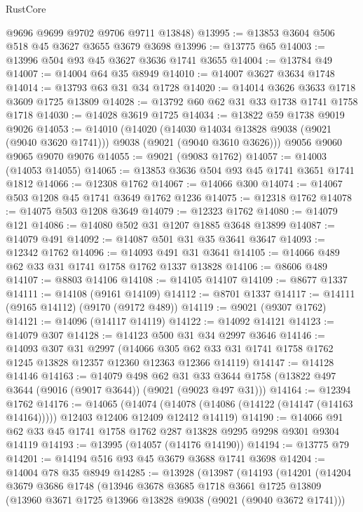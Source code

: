 \begin{lexlean}{RustCore}
\begin{coremodule}
      @9696
      @9699
      @9702
      @9706
      @9711
      @13848)
@13995 := @13853 @3604 @506 @518 @45 @3627 @3655 @3679 @3698
@13996 := @13775 @65
@14003 := @13996 @504 @93 @45 @3627 @3636 @1741 @3655
@14004 := @13784 @49
@14007 := @14004 @64 @35 @8949
@14010 := @14007 @3627 @3634 @1748
@14014 := @13793 @63 @31 @34 @1728
@14020 := @14014 @3626 @3633 @1718 @3609 @1725 @13809
@14028 := @13792 @60 @62 @31 @33 @1738 @1741 @1758 @1718
@14030 := @14028 @3619 @1725
@14034 := @13822 @59 @1738 @9019 @9026
@14053 := @14010
    (@14020
      (@14030 @14034 @13828 @9038 (@9021 (@9040 @3620 @1741)))
      @9038
      (@9021 (@9040 @3610 @3626)))
    @9056
    @9060
    @9065
    @9070
    @9076
@14055 := @9021 (@9083 @1762)
@14057 := @14003 (@14053 @14055)
@14065 := @13853 @3636 @504 @93 @45 @1741 @3651 @1741 @1812
@14066 := @12308 @1762
@14067 := @14066 @300
@14074 := @14067 @503 @1208 @45 @1741 @3649 @1762 @1236
@14075 := @12318 @1762
@14078 := @14075 @503 @1208 @3649
@14079 := @12323 @1762
@14080 := @14079 @121
@14086 := @14080 @502 @31 @1207 @1885 @3648 @13899
@14087 := @14079 @491
@14092 := @14087 @501 @31 @35 @3641 @3647
@14093 := @12342 @1762
@14096 := @14093 @491 @31 @3641
@14105 := @14066 @489 @62 @33 @31 @1741 @1758 @1762 @1337 @13828
@14106 := @8606 @489
@14107 := @8803 @14106
@14108 := @14105 @14107
@14109 := @8677 @1337
@14111 := @14108 (@9161 @14109)
@14112 := @8701 @1337
@14117 := @14111 (@9165 @14112) (@9170 (@9172 @489))
@14119 := @9021 (@9307 @1762)
@14121 := @14096 (@14117 @14119)
@14122 := @14092 @14121
@14123 := @14079 @307
@14128 := @14123 @500 @31 @34 @2997 @3646
@14146 := @14093
    @307
    @31
    @2997
    (@14066 @305 @62 @33 @31 @1741 @1758 @1762 @1245 @13828 @12357 @12360 @12363 @12366 @14119)
@14147 := @14128 @14146
@14163 := @14079
    @498
    @62
    @31
    @33
    @3644
    @1758
    (@13822 @497 @3644 (@9016 (@9017 @3644)) (@9021 (@9023 @497 @31)))
@14164 := @12394 @1762
@14176 := @14065
    (@14074 (@14078 (@14086 (@14122 (@14147 (@14163 @14164))))) @12403 @12406 @12409 @12412 @14119)
@14190 := @14066 @91 @62 @33 @45 @1741 @1758 @1762 @287 @13828 @9295 @9298 @9301 @9304 @14119
@14193 := @13995 (@14057 (@14176 @14190))
@14194 := @13775 @79
@14201 := @14194 @516 @93 @45 @3679 @3688 @1741 @3698
@14204 := @14004 @78 @35 @8949
@14285 := @13928
    (@13987
      (@14193
        (@14201
          (@14204
            @3679
            @3686
            @1748
            (@13946
              @3678
              @3685
              @1718
              @3661
              @1725
              @13809
              (@13960 @3671 @1725 @13966 @13828 @9038 (@9021 (@9040 @3672 @1741)))

\end{coremodule}
\end{lexlean}
